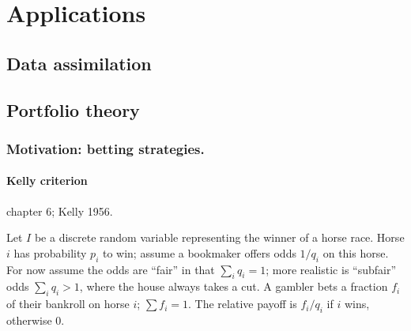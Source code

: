 \documentclass[notitlepage,openany,11pt]{report}
\theoremstyle{plain}%
\numberwithin{equation}{section}
\begin{document}
\chapter{Applications}


\section{Data assimilation}


\section{Portfolio theory}

\subsection{Motivation: betting strategies.}

\subsubsection{Kelly criterion} \cite{CoverThomas:91} chapter 6; Kelly 1956.

Let $I$ be a discrete random variable representing the winner of a horse race. Horse $i$ has probability $p_{i}$ to win; assume a bookmaker offers odds $1/q_{i}$ on this horse. For now assume the odds are ``fair'' in that $\sum_{i} q_{i} = 1$; more realistic is ``subfair'' odds $\sum_{i} q_{i} > 1$, where the house always takes a cut. A gambler bets a fraction $f_{i}$ of their bankroll on horse $i$; $\sum f_{i} = 1$. The relative payoff is $f_{i}/q_{i}$ if $i$ wins, otherwise $0$. 
\end{document}
